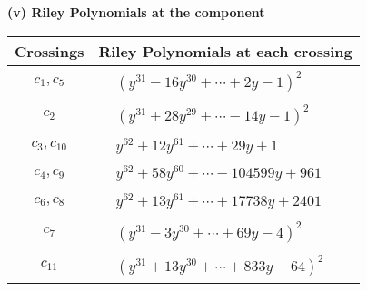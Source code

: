 \documentclass[1p]{elsarticle_modified}
\theoremstyle{definition}
\begin{document}
\flushleft \textbf{(v) Riley Polynomials at the component}\newline \\
\begin{tabular}{m{50pt}|m{274pt}}
Crossings & \hspace{64pt}Riley Polynomials at each crossing \\
\hline $$\begin{aligned}c_{1},c_{5}\end{aligned}$$&$\begin{aligned}
&(y^{31}-16 y^{30}+\cdots+2 y-1)^{2}
\end{aligned}$\\
\hline $$\begin{aligned}c_{2}\end{aligned}$$&$\begin{aligned}
&(y^{31}+28 y^{29}+\cdots-14 y-1)^{2}
\end{aligned}$\\
\hline $$\begin{aligned}c_{3},c_{10}\end{aligned}$$&$\begin{aligned}
&y^{62}+12 y^{61}+\cdots+29 y+1
\end{aligned}$\\
\hline $$\begin{aligned}c_{4},c_{9}\end{aligned}$$&$\begin{aligned}
&y^{62}+58 y^{60}+\cdots-104599 y+961
\end{aligned}$\\
\hline $$\begin{aligned}c_{6},c_{8}\end{aligned}$$&$\begin{aligned}
&y^{62}+13 y^{61}+\cdots+17738 y+2401
\end{aligned}$\\
\hline $$\begin{aligned}c_{7}\end{aligned}$$&$\begin{aligned}
&(y^{31}-3 y^{30}+\cdots+69 y-4)^{2}
\end{aligned}$\\
\hline $$\begin{aligned}c_{11}\end{aligned}$$&$\begin{aligned}
&(y^{31}+13 y^{30}+\cdots+833 y-64)^{2}
\end{aligned}$\\
\hline
\end{tabular}\\~\\
\end{document}
